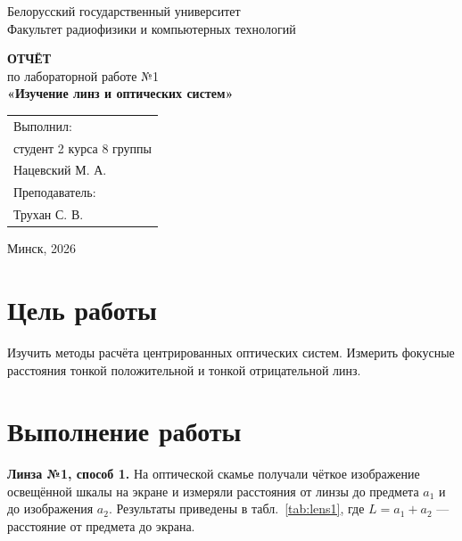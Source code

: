 \documentclass[14pt,a4paper]{extarticle}
\begin{document}
\begin{titlepage}
\begin{center}
\onehalfspacing
Белорусский государственный университет\\
Факультет радиофизики и компьютерных технологий

\vspace{4cm}

\textbf{ОТЧЁТ}\\
по лабораторной работе №1\\[0.3cm]
\textbf{«Изучение линз и оптических систем»}

\vspace{4cm}

\begin{flushright}
\begin{tabular}{@{}p{7.5cm}@{}}
\raggedright
Выполнил:\\
студент 2 курса 8 группы\\
Нацевский М. А.\\
Преподаватель:\\
Трухан С. В.\\
\end{tabular}
\end{flushright}

\vfill
Минск, 2026
\end{center}
\end{titlepage}
\setcounter{page}{2}

\section*{Цель работы}

Изучить методы расчёта центрированных оптических систем. Измерить фокусные расстояния тонкой положительной и тонкой отрицательной линз.

\section*{Выполнение работы}

\textbf{Линза №1, способ 1.} На оптической скамье получали чёткое изображение освещённой шкалы на экране и измеряли расстояния от линзы до предмета $a_1$ и до изображения $a_2$. Результаты приведены в табл.~\ref{tab:lens1}, где $L = a_1 + a_2$ --- расстояние от предмета до экрана.
\end{document}
